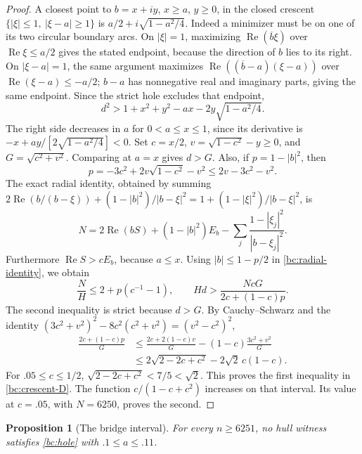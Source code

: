 \documentclass[11pt,reqno]{amsart}
\numberwithin{equation}{section}
\newtheorem{proposition}[theorem]{Proposition}
\theoremstyle{definition}
\theoremstyle{remark}
\renewcommand{\Re}{\operatorname{Re}}
\begin{document}
\begin{proof}
A closest point to $b=x+iy$, $x\geq a$, $y\geq0$, in the closed
crescent $\{|\xi|\leq1,\ |\xi-a|\geq1\}$ is
$a/2+i\sqrt{1-a^2/4}$.  Indeed a minimizer must be on one of its
two circular boundary arcs.  On $|\xi|=1$, maximizing
$\Re(\overline b\xi)$ over $\Re\xi\leq a/2$ gives the stated
endpoint, because the direction of $b$ lies to its right.
On $|\xi-a|=1$, the same argument maximizes
$\Re((\overline b-a)(\xi-a))$ over
$\Re(\xi-a)\leq-a/2$; $b-a$ has nonnegative real and imaginary
parts, giving the same endpoint.  Since the strict hole excludes
that endpoint,
\[
 d^2>1+x^2+y^2-ax-2y\sqrt{1-a^2/4}.
\]
The right side decreases in $a$ for $0<a\leq x\leq1$, since its
derivative is $-x+ay/[2\sqrt{1-a^2/4}]<0$.
Set $c=x/2$, $v=\sqrt{1-c^2}-y\geq0$, and
$G=\sqrt{c^2+v^2}$.  Comparing at $a=x$ gives $d>G$.
Also, if $p=1-|b|^2$, then
\[
 p=-3c^2+2v\sqrt{1-c^2}-v^2\leq2v-3c^2-v^2.
\]
The exact radial identity, obtained by summing
$2\Re(b/(b-\xi))+(1-|b|^2)/|b-\xi|^2
=1+(1-|\xi|^2)/|b-\xi|^2$, is
\begin{equation}\label{bc:radial-identity}
 N=2\Re(bS)+(1-|b|^2)E_b
       -\sum_j\frac{1-|\xi_j|^2}{|b-\xi_j|^2}.
\end{equation}
Furthermore $\Re S>cE_b$, because $a\leq x$.
Using $|b|\leq1-p/2$ in \eqref{bc:radial-identity}, we obtain
\[
 \frac NH\leq2+p(c^{-1}-1),\qquad
 Hd>\frac{NcG}{2c+(1-c)p}.
\]
The second inequality is strict because $d>G$.
By Cauchy--Schwarz and the identity
$(3c^2+v^2)^2-8c^2(c^2+v^2)=(v^2-c^2)^2$,
\begin{align*}
 \frac{2c+(1-c)p}{G}
 &\leq\frac{2c+2(1-c)v}{G}
       -(1-c)\frac{3c^2+v^2}{G}\\
 &\leq2\sqrt{2-2c+c^2}-2\sqrt2\,c(1-c).
\end{align*}
For $.05\leq c\leq1/2$, $\sqrt{2-2c+c^2}<7/5<\sqrt2$.
This proves the first inequality in \eqref{bc:crescent-D}.
The function $c/(1-c+c^2)$ increases on that interval.
Its value at $c=.05$, with $N=6250$, proves the second.
\end{proof}

\begin{proposition}[The bridge interval]\label{bc:bridge}
For every $n\geq6251$, no hull witness satisfies
\eqref{bc:hole} with $.1\leq a\leq.11$.
\end{proposition}
\end{document}
